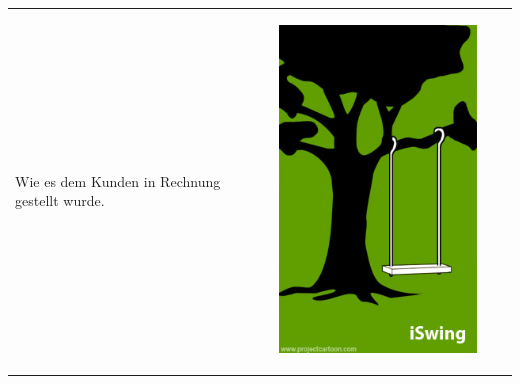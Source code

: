 \begin{tabularx}{\textwidth}{XXXX}
\begin{minipage}[t]{0.23\textwidth}
\begin{center}
Wie es dem Kunden in Rechnung gestellt wurde.
\end{center}
\end{minipage}
& 
\begin{minipage}[t]{0.23\textwidth}
\begin{center}
\includegraphics[width=1.0\textwidth]{./inf/SEKII/29_Softwaretechnik/PM_10.jpg}


\end{center}
\end{minipage}
\end{tabularx}
